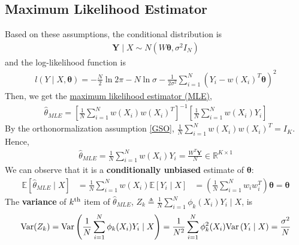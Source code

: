 \documentclass[11pt]{elegantbook}
\begin{document}
\subsection{Maximum Likelihood Estimator}
Based on these assumptions, the conditional distribution is
\begin{equation}
    \begin{aligned}
        \boldsymbol{Y}\mid X\sim N(W \boldsymbol{\theta},\sigma^2 I_N)
    \end{aligned}
    \nonumber
\end{equation}
and the log-likelihood function is
\begin{equation}
    \begin{aligned}
        l(Y\mid X,\boldsymbol{\theta})=-\frac{N}{2}\ln 2\pi-N\ln\sigma-\frac{1}{2\sigma^2}\sum_{i=1}^N\left(Y_i-w(X_i)^T \boldsymbol{\theta}\right)^2
    \end{aligned}
    \nonumber
\end{equation}
Then, we get the \underline{maximum likelihood estimator (MLE)},
\begin{equation}
    \begin{aligned}
        \hat{\theta}_{MLE}=\left[\frac{1}{N}\sum_{i=1}^N w(X_i)w(X_i)^T\right]^{-1}\left[\frac{1}{N}\sum_{i=1}^N w(X_i)Y_i\right]
    \end{aligned}
    \nonumber
\end{equation}
By the orthonormalization assumption \ref{GSO}, $\frac{1}{N}\sum_{i=1}^N w(X_i)w(X_i)^T=I_{K}$.
Hence,
\begin{equation}
    \begin{aligned}
        \hat{\theta}_{MLE}=\frac{1}{N}\sum_{i=1}^N w(X_i)Y_i=\frac{W^T \boldsymbol{Y}}{N}\in \mathbb{R}^{K\times 1}
    \end{aligned}
    \nonumber
\end{equation}
We can observe that it is a \textbf{conditionally unbiased} estimate of $\boldsymbol{\theta}$:
\begin{equation}
    \begin{aligned}
        \mathbb{E}[\hat{\theta}_{MLE}\mid X]&=\frac{1}{N}\sum_{i=1}^N w(X_i)\mathbb{E}[Y_i\mid X]
        &=\left(\frac{1}{N}\sum_{i=1}^N w_iw_i^T\right)\boldsymbol{\theta}=\boldsymbol{\theta}
    \end{aligned}
    \nonumber
\end{equation}
The \textbf{variance} of $k^\textnormal{th}$ item of $\hat{\theta}_{MLE}$, $Z_k\triangleq\frac{1}{N}\sum_{i=1}^N\phi_k(X_i)Y_i\mid X$, is
\begin{equation}
    \begin{aligned}
        \textnormal{Var}(Z_k)=
        \textnormal{Var}\left(\frac{1}{N}\sum_{i=1}^N\phi_k(X_i)Y_i\mid X\right)=\frac{1}{N^2}\sum_{i=1}^N\phi^2_k(X_i)\textnormal{Var}\left(Y_i\mid X\right)=\frac{\sigma^2}{N}
    \end{aligned}
    \nonumber
\end{equation}
\end{document}

